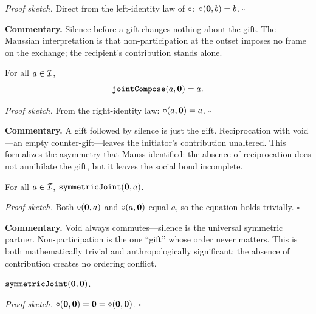 \noindent\textit{Proof sketch.}\quad
Direct from the left-identity law of $\circ$: $\circ(\mathbf{0}, b) = b$.
\hfill$\square$

\medskip

\noindent\textbf{Commentary.}
Silence before a gift changes nothing about the gift.  The Maussian
interpretation is that non-participation at the outset imposes no frame on
the exchange; the recipient's contribution stands alone.

\begin{theorem}
\label{thm:void_joint_right}
For all $a \in \mathcal{I}$,
\[
  \texttt{jointCompose}(a, \mathbf{0}) = a.
\]
\end{theorem}

\noindent\textit{Proof sketch.}\quad
From the right-identity law: $\circ(a, \mathbf{0}) = a$.
\hfill$\square$

\medskip

\noindent\textbf{Commentary.}
A gift followed by silence is just the gift.  Reciprocation with void---an
empty counter-gift---leaves the initiator's contribution unaltered.  This
formalizes the asymmetry that Mauss identified: the absence of reciprocation
does not annihilate the gift, but it leaves the social bond incomplete.

\begin{theorem}
\label{thm:void_symmetric_left}
For all $a \in \mathcal{I}$, $\texttt{symmetricJoint}(\mathbf{0}, a)$.
\end{theorem}

\noindent\textit{Proof sketch.}\quad
Both $\circ(\mathbf{0}, a)$ and $\circ(a, \mathbf{0})$ equal $a$, so
the equation holds trivially.
\hfill$\square$

\medskip

\noindent\textbf{Commentary.}
Void always commutes---silence is the universal symmetric partner.
Non-participation is the one ``gift'' whose order never matters.
This is both mathematically trivial and anthropologically significant:
the absence of contribution creates no ordering conflict.

\begin{theorem}
\label{thm:void_symmetric_self}
$\texttt{symmetricJoint}(\mathbf{0}, \mathbf{0})$.
\end{theorem}

\noindent\textit{Proof sketch.}\quad
$\circ(\mathbf{0}, \mathbf{0}) = \mathbf{0} = \circ(\mathbf{0}, \mathbf{0})$.
\hfill$\square$

\medskip

